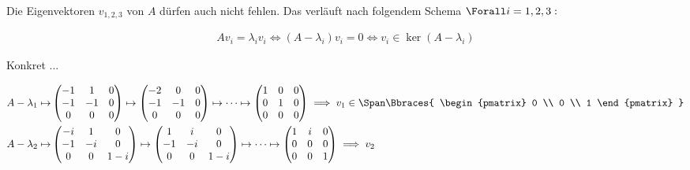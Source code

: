 \begin{solution}
Die Eigenvektoren $v_{1, 2, 3}$ von $A$ dürfen auch nicht fehlen.
Das verläuft nach folgendem Schema $\Forall i = 1, 2, 3:$

\begin{align*}
    A v_i = \lambda_i v_i
    \iff
    (A - \lambda_i) v_i = 0
    \iff
    v_i \in \ker{(A - \lambda_i)}
\end{align*}

Konkret ...

\begin{align*}
    A - \lambda_1
    \mapsto &
    \begin{pmatrix}
        -1 &  1 & 0 \\
        -1 & -1 & 0 \\
         0 &  0 & 0
    \end{pmatrix}
    \mapsto
    \begin{pmatrix}
        -2 &  0 & 0 \\
        -1 & -1 & 0 \\
         0 &  0 & 0
    \end{pmatrix}
    \mapsto \cdots \mapsto
    \begin{pmatrix}
        1 & 0 & 0 \\
        0 & 1 & 0 \\
        0 & 0 & 0
    \end{pmatrix}
    \implies
    v_1
    \in
    \Span \Bbraces
    {
        \begin{pmatrix}
            0 \\ 0 \\ 1
        \end{pmatrix}
    } \\
    A - \lambda_2
    \mapsto &
    \begin{pmatrix}
        -i &  1 & 0 \\
        -1 & -i & 0 \\
         0 &  0 & 1 - i
    \end{pmatrix}
    \mapsto
    \begin{pmatrix}
         1 &  i & 0 \\
        -1 & -i & 0 \\
         0 &  0 & 1 - i
    \end{pmatrix}
    \mapsto \cdots \mapsto
    \begin{pmatrix}
        1 & i & 0 \\
        0 & 0 & 0 \\
        0 & 0 & 1
    \end{pmatrix}
    \implies
    v_2

\end{align*}
\end{solution}
